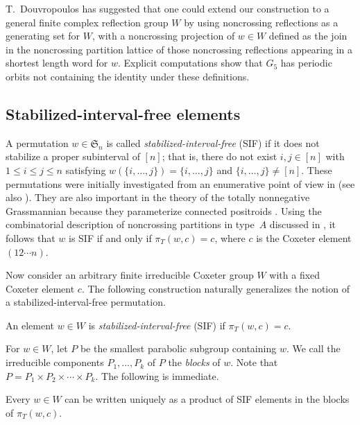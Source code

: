 \documentclass[ALCO,ThmDefs,Unicode,epreuves]{cedram}
\newcommand{\darkblue}{\color{darkblue}}
\newcommand{\defn}[1]{\emph{\darkblue #1}}
\begin{document}
\begin{rema}
T.~Douvropoulos has suggested that one could extend our construction to a general finite complex reflection group $W$ by using noncrossing reflections as a generating set for $W$, with a noncrossing projection of $w \in W$ defined as the join in the noncrossing partition lattice of those noncrossing reflections appearing in a shortest length word for $w$.  Explicit computations show that $G_5$ has periodic orbits not containing the identity under these definitions.
\end{rema}


\subsection{Stabilized-interval-free elements}

A permutation $w\in\mathfrak S_n$ is called \defn{stabilized-interval-free} (SIF) if it does not stabilize a proper subinterval of $[n]$; that is, there do not exist $i,j\in[n]$ with $1\leq i\leq j\leq n$ satisfying $w(\{i,\ldots,j\})=\{i,\ldots,j\}$ and $\{i,\ldots,j\}\neq[n]$. These permutations were initially investigated from an enumerative point of view in \cite{callan2004counting} (see also \cite{blitvic2014stabilized}). They are also important in the theory of the totally nonnegative Grassmannian because they parameterize connected positroids \cite{ArdilaRinconWilliams}. Using the combinatorial description of noncrossing partitions in type~$A$ discussed in , it follows that $w$ is SIF if and only if $\pi_T(w,c)=c$, where $c$ is the Coxeter element $(12\cdots n)$. 

Now consider an arbitrary finite irreducible Coxeter group $W$ with a fixed Coxeter element $c$.  The following construction naturally generalizes the notion of a stabilized-interval-free permutation. 



\begin{defi}
\label{def:sif}
An element $w\in W$ is \defn{stabilized-interval-free} (SIF) if $\pi_T(w,c)=c$.
\end{defi}



For $w\in W$, let $P$ be the smallest parabolic subgroup containing $w$. We call the irreducible components $P_1,\ldots,P_k$ of $P$ the \defn{blocks} of $w$. Note that $P=P_1 \times P_2 \times \cdots \times P_k$.  The following is immediate. 

\begin{prop}
Every $w \in W$ can be written uniquely as a product of SIF elements in the blocks of $\pi_T(w,c)$.
\end{prop}
\end{document}
